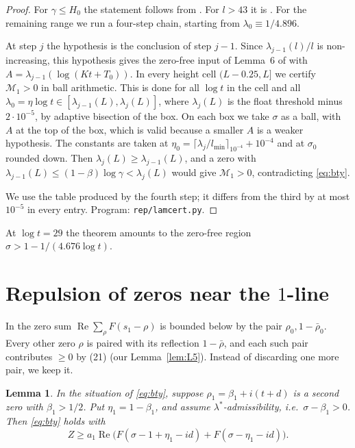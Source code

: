 \documentclass[11pt]{amsart}
\numberwithin{equation}{section}
\newtheorem{lemma}[theorem]{Lemma}
\theoremstyle{definition}
\theoremstyle{remark}
\newcommand{\Rp}{\operatorname{Re}}
\newcommand{\code}[1]{\texttt{#1}}
\begin{document}
\begin{proof}
For $\gamma \le H_0$ the statement follows from \cite{PlattTrudgianRH}.
For $l > 43$ it is \cite[Thm.~1]{BTY}.
For the remaining range we run a four-step chain, starting from $\lambda_0 \equiv 1/4.896$.

At step $j$ the hypothesis is the conclusion of step $j-1$.
Since $\lambda_{j-1}(l)/l$ is non-increasing, this hypothesis gives the zero-free input of Lemma~6 of \cite{BTY} with $A = \lambda_{j-1}(\log(Kt+T_0))$.
In every height cell $(L - 0.25, L]$ we certify $\mathcal M_1 > 0$ in ball arithmetic.
This is done for all $\log t$ in the cell and all $\lambda_0 = \eta\log t \in [\lambda_{j-1}(L), \lambda_j(L)]$, where $\lambda_j(L)$ is the float threshold minus $2\cdot10^{-5}$, by adaptive bisection of the box.
On each box we take $\sigma$ as a ball, with $A$ at the top of the box, which is valid because a smaller $A$ is a weaker hypothesis.
The constants are taken at $\eta_0 = \lceil \lambda_j/l_{\min}\rceil_{10^{-4}} + 10^{-4}$ and at $\sigma_0$ rounded down.
Then $\lambda_j(L) \ge \lambda_{j-1}(L)$, and a zero with $\lambda_{j-1}(L) \le (1-\beta)\log\gamma < \lambda_j(L)$ would give $\mathcal M_1 > 0$, contradicting \eqref{eq:bty}.

We use the table produced by the fourth step; it differs from the third by at most $10^{-5}$ in every entry.
Program: \code{rep/lamcert.py}.
\end{proof}

At $\log t = 29$ the theorem amounts to the zero-free region $\sigma > 1 - 1/(4.676\log t)$.
\section{Repulsion of zeros near the $1$-line}\label{sec:rep}

In \cite[Lemma~6]{BTY} the zero sum $\Rp\sum_\rho F(s_1-\rho)$ is bounded below by the pair $\rho_0, 1-\bar\rho_0$.
Every other zero $\rho$ is paired with its reflection $1-\bar\rho$, and each such pair contributes $\ge 0$ by (21) (our Lemma~\ref{lem:L5}).
Instead of discarding one more pair, we keep it.

\begin{lemma}\label{lem:twozero}
In the situation of \eqref{eq:bty}, suppose $\rho_1 = \beta_1 + i(t+d)$ is a second zero with $\beta_1 > 1/2$.
Put $\eta_1 = 1-\beta_1$, and assume $\lambda^*$-admissibility, i.e.\ $\sigma - \beta_1 > 0$. Then \eqref{eq:bty} holds with
\[
Z \ge a_1\Rp\big(F(\sigma - 1 + \eta_1 - id) + F(\sigma - \eta_1 - id)\big) .
\]
\end{lemma}
\end{document}
